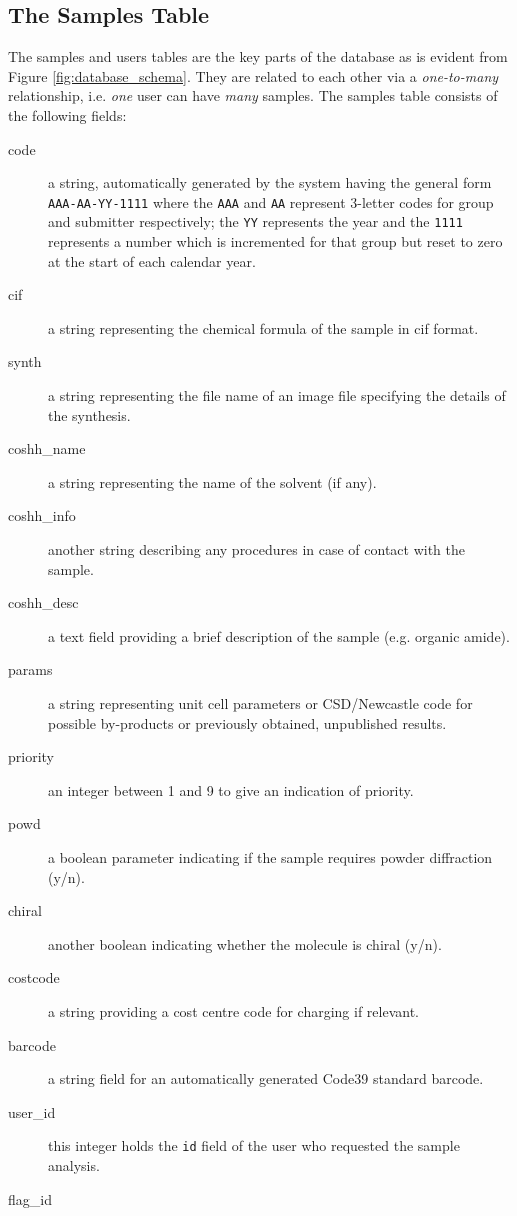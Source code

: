 \documentclass[12pt,twoside]{article}
\begin{document}
\subsection{The Samples Table}
The samples and users tables are the key parts of the database as is
evident from Figure \ref{fig:database_schema}. They are related to each
other via a \emph{one-to-many} relationship, i.e. \emph{one} user
can have \emph{many} samples. The samples table
consists of the following fields:
\begin{description}
\item[code]
a string, automatically generated by the system having the
general form \verb=AAA-AA-YY-1111= where the \verb=AAA= and \verb=AA= 
represent 3-letter codes for group and submitter respectively; 
the \verb=YY= represents the year and the \verb=1111= represents a number 
which is incremented for that group but reset to zero at the start of each 
calendar year.
\item[cif]
a string representing the chemical formula of the sample in cif format.
\item[synth]
a string representing the file name of an image file specifying the details
of the synthesis.
\item[coshh\_name]
a string representing the name of the solvent (if any).
\item[coshh\_info]
another string describing any procedures in case of contact with the sample.
\item[coshh\_desc]
a text field providing a brief description of the sample (e.g. organic amide).
\item[params]
a string representing unit cell parameters
or CSD/Newcastle code for possible by-products or previously obtained, 
unpublished results.
\item[priority]
an integer between 1 and 9 to give an indication of priority.
\item[powd]
a boolean parameter indicating if the sample requires powder diffraction (y/n).
\item[chiral]
another boolean indicating whether the molecule is chiral (y/n).
\item[costcode]
a string providing a cost centre code for charging if relevant.
\item[barcode]
a string field for an automatically generated Code39 standard barcode.
\item[user\_id]
this integer holds the \verb=id= field of the user who requested the
sample analysis.
\item[flag\_id]

\end{description}
\end{document}
